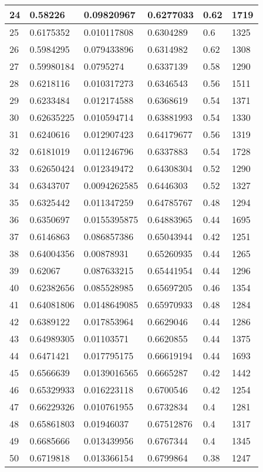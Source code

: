 \begin{longtable}{|l|l|l|l|l|l|}
24 & 0.58226 & 0.09820967 & 0.6277033 & 0.62 & 1719 \\ \hline 
25 & 0.6175352 & 0.010117808 & 0.6304289 & 0.6 & 1325 \\ \hline 
26 & 0.5984295 & 0.079433896 & 0.6314982 & 0.62 & 1308 \\ \hline 
27 & 0.59980184 & 0.0795274 & 0.6337139 & 0.58 & 1290 \\ \hline 
28 & 0.6218116 & 0.010317273 & 0.6346543 & 0.56 & 1511 \\ \hline 
29 & 0.6233484 & 0.012174588 & 0.6368619 & 0.54 & 1371 \\ \hline 
30 & 0.62635225 & 0.010594714 & 0.63881993 & 0.54 & 1330 \\ \hline 
31 & 0.6240616 & 0.012907423 & 0.64179677 & 0.56 & 1319 \\ \hline 
32 & 0.6181019 & 0.011246796 & 0.6337883 & 0.54 & 1728 \\ \hline 
33 & 0.62650424 & 0.012349472 & 0.64308304 & 0.52 & 1290 \\ \hline 
34 & 0.6343707 & 0.0094262585 & 0.6446303 & 0.52 & 1327 \\ \hline 
35 & 0.6325442 & 0.011347259 & 0.64785767 & 0.48 & 1294 \\ \hline 
36 & 0.6350697 & 0.0155395875 & 0.64883965 & 0.44 & 1695 \\ \hline 
37 & 0.6146863 & 0.086857386 & 0.65043944 & 0.42 & 1251 \\ \hline 
38 & 0.64004356 & 0.00878931 & 0.65260935 & 0.44 & 1265 \\ \hline 
39 & 0.62067 & 0.087633215 & 0.65441954 & 0.44 & 1296 \\ \hline 
40 & 0.62382656 & 0.085528985 & 0.65697205 & 0.46 & 1354 \\ \hline 
41 & 0.64081806 & 0.0148649085 & 0.65970933 & 0.48 & 1284 \\ \hline 
42 & 0.6389122 & 0.017853964 & 0.6629046 & 0.44 & 1286 \\ \hline 
43 & 0.64989305 & 0.01103571 & 0.6620855 & 0.44 & 1375 \\ \hline 
44 & 0.6471421 & 0.017795175 & 0.66619194 & 0.44 & 1693 \\ \hline 
45 & 0.6566639 & 0.0139016565 & 0.6665287 & 0.42 & 1442 \\ \hline 
46 & 0.65329933 & 0.016223118 & 0.6700546 & 0.42 & 1254 \\ \hline 
47 & 0.66229326 & 0.010761955 & 0.6732834 & 0.4 & 1281 \\ \hline 
48 & 0.65861803 & 0.01946037 & 0.67512876 & 0.4 & 1317 \\ \hline 
49 & 0.6685666 & 0.013439956 & 0.6767344 & 0.4 & 1345 \\ \hline 
50 & 0.6719818 & 0.013366154 & 0.6799864 & 0.38 & 1247 \\ \hline 
\end{longtable}